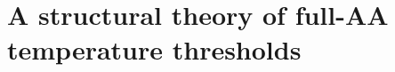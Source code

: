 \section{A structural theory of full-AA temperature thresholds}
\label{sec:threshold-theory}







